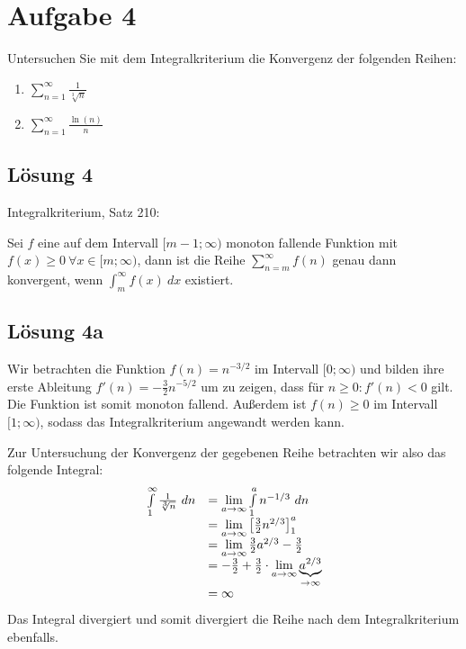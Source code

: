 \documentclass[main.tex]{subfiles}
\begin{document}
\section{Aufgabe 4}
Untersuchen Sie mit dem Integralkriterium die Konvergenz der folgenden Reihen:

\begin{enumerate}
    \item $\sum\limits _{n=1}^{\infty }\frac{1}{\sqrt[3]{n}}$
    \item $\sum\limits _{n=1}^{\infty }\frac{\ln( n)}{n}$
\end{enumerate}

\subsection{Lösung 4}
Integralkriterium, Satz 210:

Sei $f$ eine auf dem Intervall $[ m-1;\infty )$ monoton fallende Funktion mit $f( x) \geq 0\ \forall x\in [ m;\infty )$, dann ist die Reihe $\sum _{n=m}^{\infty } f( n)$ genau dann konvergent, wenn $\int _{m}^{\infty } f( x) \ dx$ existiert.

\subsection{Lösung 4a}
Wir betrachten die Funktion $f( n) =n^{-3/2}$ im Intervall $[ 0;\infty )$ und bilden ihre erste Ableitung $f'( n) =-\frac{3}{2} n^{-5/2}$ um zu zeigen, dass für $n\geq 0:f'( n) < 0$ gilt. Die Funktion ist somit monoton fallend. Außerdem ist $f( n) \geq 0$ im Intervall $[ 1;\infty )$, sodass das Integralkriterium angewandt werden kann.

Zur Untersuchung der Konvergenz der gegebenen Reihe betrachten wir also das folgende Integral:
\begin{equation*}
\begin{array}{ c l }
\int\limits _{1}^{\infty }\frac{1}{\sqrt[3]{n}} \ dn & =\lim\limits _{a\rightarrow \infty }\int\limits _{1}^{a} n^{-1/3} \ dn\\
 & =\lim\limits _{a\rightarrow \infty }\left[\frac{3}{2} n^{2/3}\right]_{1}^{a}\\
 & =\lim\limits _{a\rightarrow \infty }\frac{3}{2} a^{2/3} -\frac{3}{2}\\
 & =-\frac{3}{2} +\frac{3}{2} \cdotp \lim\limits _{a\rightarrow \infty }\underbrace{a^{2/3}}_{\rightarrow \infty }\\
 & =\infty 
\end{array}
\end{equation*}
Das Integral divergiert und somit divergiert die Reihe nach dem Integralkriterium ebenfalls.
\end{document}
